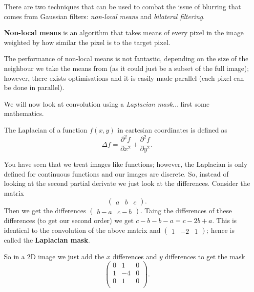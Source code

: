 There are two techniques that can be used to combat the issue of blurring that comes from Gaussian filters: \emph{non-local means} and \emph{bilateral filtering}.

\begin{definition}
    \textbf{Non-local means} is an algorithm that takes means of every pixel in the image weighted by how similar the pixel is to the target pixel. 
\end{definition}

The performance of non-local means is not fantastic, depending on the size of the neighbour we take the means from (as it could just be a subset of the full image); however, there exists optimisations and it is easily made parallel (each pixel can be done in parallel).

We will now look at convolution using a \emph{Laplacian mask}... first some mathematics.

\begin{definition}[Laplacian]
    The Laplacian of a function $f(x, y)$ in cartesian coordinates is defined as
    \[ \Delta f = \frac{\partial^2f}{\partial x^2} + \frac{\partial^2f}{\partial y^2}. \]
\end{definition}

You have seen that we treat images like functions; however, the Laplacian is only defined for continuous functions and our images are discrete. So, instead of looking at the second partial derivate we just look at the differences. Consider the matrix
\[
    \begin{pmatrix}
        a & b & c
    \end{pmatrix}
    .
\]
Then we get the differences $\begin{pmatrix} b - a & c - b \end{pmatrix}$. Taing the differences of these differences (to get our second order) we get $c - b - b - a = c - 2b + a$. This is identical to the convolution of the above matrix and $\begin{pmatrix} 1 & -2 & 1 \end{pmatrix}$; hence is called the \textbf{Laplacian mask}.

So in a 2D image we just add the $x$ differences and $y$ differences to get the mask
\[
    \begin{pmatrix}
        0 & 1 & 0 \\
        1 & -4 & 0 \\
        0 & 1 & 0 \\
    \end{pmatrix}
    .
\]

